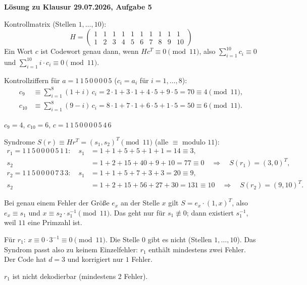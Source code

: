 \textbf{Lösung zu Klausur 29.07.2026, Aufgabe 5}

 Kontrollmatrix (Stellen $1, \dots, 10$):
\[
H = \begin{pmatrix}
1 & 1 & 1 & 1 & 1 & 1 & 1 & 1 & 1 & 1\\
1 & 2 & 3 & 4 & 5 & 6 & 7 & 8 & 9 & 10
\end{pmatrix}
\]
Ein Wort $c$ ist Codewort genau dann, wenn $H c^T \equiv 0 \pmod{11}$, also
$\sum_{i=1}^{10} c_i \equiv 0$ und $\sum_{i=1}^{10} i \cdot c_i \equiv 0 \pmod{11}$.

 Kontrollziffern für $a = 1\,1\,5\,0\,0\,0\,0\,5$ ($c_i = a_i$ für $i = 1, \dots, 8$):
\begin{align*}
c_9 &\equiv \sum_{i=1}^{8} (1+i)\, c_i = 2 \cdot 1 + 3 \cdot 1 + 4 \cdot 5 + 9 \cdot 5 = 70 \equiv 4 \pmod{11},\\
c_{10} &\equiv \sum_{i=1}^{8} (9-i)\, c_i = 8 \cdot 1 + 7 \cdot 1 + 6 \cdot 5 + 1 \cdot 5 = 50 \equiv 6 \pmod{11}.
\end{align*}
\begin{ergebnis} $c_9 = 4$, $c_{10} = 6$, $c = 1\,1\,5\,0\,0\,0\,0\,5\,4\,6$ \end{ergebnis}

 Syndrome $S(r) \equiv H r^T = (s_1, s_2)^T \pmod{11}$ (alle $\equiv$ modulo $11$):
\begin{align*}
r_1 = 1\,1\,5\,0\,0\,0\,0\,5\,1\,1:\quad
s_1 &= 1 + 1 + 5 + 5 + 1 + 1 = 14 \equiv 3,\\
s_2 &= 1 + 2 + 15 + 40 + 9 + 10 = 77 \equiv 0 \quad\Rightarrow\quad S(r_1) = (3, 0)^T,\\[4pt]
r_2 = 1\,1\,5\,0\,0\,0\,0\,7\,3\,3:\quad
s_1 &= 1 + 1 + 5 + 7 + 3 + 3 = 20 \equiv 9,\\
s_2 &= 1 + 2 + 15 + 56 + 27 + 30 = 131 \equiv 10 \quad\Rightarrow\quad S(r_2) = (9, 10)^T .
\end{align*}

 Bei genau einem Fehler der Größe $e_x$ an der Stelle $x$ gilt $S = e_x \cdot (1, x)^T$,
also $e_x \equiv s_1$ und $x \equiv s_2 \cdot s_1^{-1} \pmod{11}$.
Das geht nur für $s_1 \not\equiv 0$; dann existiert $s_1^{-1}$, weil $11$ eine Primzahl ist.

Für $r_1$: $x \equiv 0 \cdot 3^{-1} \equiv 0 \pmod{11}$. Die Stelle $0$ gibt es nicht (Stellen $1, \dots, 10$).
Das Syndrom passt also zu keinem Einzelfehler: $r_1$ enthält mindestens zwei Fehler.
Der Code hat $d = 3$ und korrigiert nur $1$ Fehler.
\begin{ergebnis} $r_1$ ist nicht dekodierbar (mindestens 2 Fehler). \end{ergebnis}

